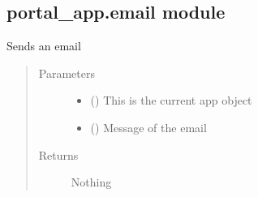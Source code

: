 \documentclass[letterpaper,10pt,english]{sphinxmanual}
\begin{document}
\begin{fulllineitems}
\label{\detokenize{CE_app:CE_app.cli.register}}
\end{fulllineitems}



\subsection{portal\_app.email module}
\label{\detokenize{CE_app:module-CE_app.email}}\label{\detokenize{CE_app:portal-app-email-module}}

\begin{fulllineitems}
\label{\detokenize{CE_app:CE_app.email.send_async_email}}
\sphinxAtStartPar
Sends an email
\begin{quote}\begin{description}
\item[{Parameters}] \leavevmode\begin{itemize}
\item {} 
\sphinxAtStartPar
{} () \textendash{} This is the current app object

\item {} 
\sphinxAtStartPar
{} () \textendash{} Message of the email

\end{itemize}

\item[{Returns}] \leavevmode
\sphinxAtStartPar
Nothing

\end{description}\end{quote}

\end{fulllineitems}
\end{document}
